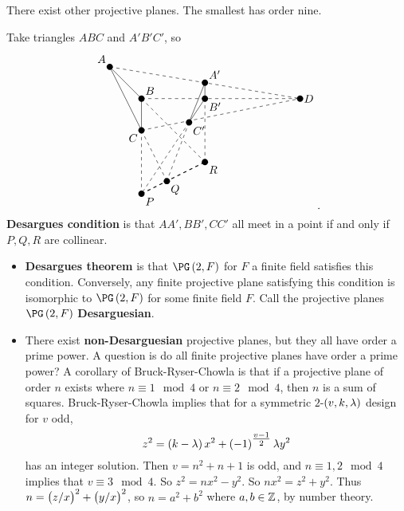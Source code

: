 \begin{note*}
There exist other projective planes. The smallest has order nine.
\end{note*}

Take triangles $ ABC $ and $ A'B'C' $, so
$$
\begin{tikzpicture}
\fill (0, 0) circle (0.1) node[above left]{$ A $};
\fill (1, -1) circle (0.1) node[above right]{$ B $};
\fill (1, -2) circle (0.1) node[below left]{$ C $};
\draw (0, 0) to (1, -2);
\draw (0, 0) to (1, -1);
\draw (1, -1) to (1, -2);
\fill (3, -0.5) circle (0.1) node[above right]{$ A' $};
\fill (3, -1) circle (0.1) node[below right]{$ B' $};
\fill (2.5, -1.75) circle (0.1) node[below right]{$ C' $};
\draw (3, -0.5) to (2.5, -1.75);
\draw (3, -0.5) to (3, -1);
\draw (3, -1) to (2.5, -1.75);
\fill (6, -1) circle (0.1) node[right]{$ D $};
\draw [dashed] (0, 0) to (6, -1);
\draw [dashed] (1, -1) to (6, -1);
\draw [dashed] (1, -2) to (6, -1);
\fill (1, -4) circle (0.1) node[below right]{$ P $};
\draw [dashed] (1, -2) to (1, -4);
\draw [dashed] (2.5, -1.75) to (1, -4);
\fill (1.8, -3.6) circle (0.1) node[below right]{$ Q $};
\draw [dashed] (1, -2) to (1.8, -3.6);
\draw [dashed] (2.5, -1.75) to (1.8, -3.6);
\fill (3, -3) circle (0.1) node[below right]{$ R $};
\draw [dashed] (1, -1) to (3, -3);
\draw [dashed] (3, -1) to (3, -3);
\draw [dashed, thick] (1, -4) to (3, -3);
\end{tikzpicture}.
$$
\textbf{Desargues condition} is that $ AA', BB', CC' $ all meet in a point if and only if $ P, Q, R $ are collinear.
\begin{itemize}
\item \textbf{Desargues theorem} is that $ \PG\br{2, F} $ for $ F $ a finite field satisfies this condition. Conversely, any finite projective plane satisfying this condition is isomorphic to $ \PG\br{2, F} $ for some finite field $ F $. Call the projective planes $ \PG\br{2, F} $ \textbf{Desarguesian}.
\item There exist \textbf{non-Desarguesian} projective planes, but they all have order a prime power. A question is do all finite projective planes have order a prime power? A corollary of Bruck-Ryser-Chowla is that if a projective plane of order $ n $ exists where $ n \equiv 1 \mod 4 $ or $ n \equiv 2 \mod 4 $, then $ n $ is a sum of squares. Bruck-Ryser-Chowla implies that for a symmetric $ 2 $-$ \br{v, k, \lambda} $ design for $ v $ odd,
$$ z^2 = \br{k - \lambda}x^2 + \br{-1}^{\tfrac{v - 1}{2}}\lambda y^2 $$
has an integer solution. Then $ v = n^2 + n + 1 $ is odd, and $ n \equiv 1, 2 \mod 4 $ implies that $ v \equiv 3 \mod 4 $. So $ z^2 = nx^2 - y^2 $. So $ nx^2 = z^2 + y^2 $. Thus $ n = \br{z / x}^2 + \br{y / x}^2 $, so $ n = a^2 + b^2 $ where $ a, b \in \mathbb{Z} $, by number theory.
\end{itemize}

